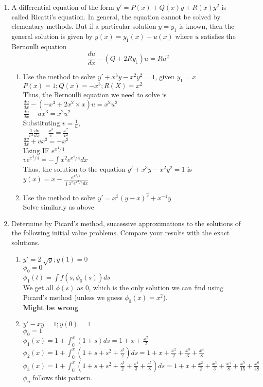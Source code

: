 \documentclass[a4paper]{article}
\begin{document}
\begin{enumerate}
\item{A differential equation of the form $y'=P(x)+Q(x)y+R(x)y^2$ is called Ricatti's equation. In general, the equation cannot be solved by elementary methods. But if a particular solution $y=y_1$ is known, then the general solution is given by $y(x)=y_1(x)+u(x)$ where $u$ satisfies the Bernoulli equation
\[\frac{du}{dx}-(Q+2Ry_1)u=Ru^2\]
\begin{enumerate}
\item{Use the method to solve $y'+x^3y-x^2y^2=1$, given $y_1=x$
\\$P(x)=1; Q(x)=-x^3; R(X)=x^2$
\\Thus, the Bernoulli equation we need to solve is
\\$\frac{du}{dx}-(-x^3+2x^2\times x)u=x^2u^2$
\\$\frac{du}{dx}-ux^3=x^2u^2$
\\Substituting $v=\frac{1}{u}$,
\\$-\frac{1}{v^2}\frac{dv}{dx}-\frac{x^3}{v}=\frac{x^2}{v^2}$
\\$\frac{dv}{dx}+vx^3=-x^2$
\\Using IF $e^{x^4/4}$
\\$ve^{x^4/4}=-\int x^2e^{x^4/4} dx$
\\Thus, the solution to the equation $y'+x^3y-x^2y^2=1$ is
\\$y(x)=x-\frac{e^{x^4/4}}{\int x^2e^{x^4/4} dx}$
}
\item{Use the method to solve $y'=x^3(y-x)^2+x^{-1}y$
\\Solve similarly as above
}
\end{enumerate}
}
\item{Determine by Picard's method, successive approximations to the solutions of the following initial value problems. Compare your results with the exact solutions.
\begin{enumerate}
\item $y'=2\sqrt[]{y}; y(1)=0$\\
$\phi_0=0$\\
$\phi_1(t)=\int f(s,\phi_0(s)) ds$\\
We get all $\phi(s)$ as $0$, which is the only solution we can find using Picard's method (unless we guess $\phi_0(x)=x^2$).\\
\textbf{Might be wrong}
\item $y'-xy=1; y(0)=1$ \\
$\phi_0=1$\\
$\phi_1(x)=1+\int_0^x (1+s) ds=1+x+\frac{x^2}{2}$\\
$\phi_2(x)=1+\int_0^x (1+s+s^2+\frac{s^3}{2}) ds=1+x+\frac{x^2}{2}+\frac{x^3}{3}+\frac{x^4}{8}$\\
$\phi_3(x)=1+\int_0^x (1+s+s^2+\frac{s^3}{2} +\frac{s^4}{3}+\frac{s^5}{8}) ds=1+x+\frac{x^2}{2}+\frac{x^3}{3}+\frac{x^4}{8}+\frac{x^5}{15}+\frac{x^6}{48	}$\\
$\phi_n$ follows this pattern.


\end{enumerate}}
\end{enumerate}
\end{document}
